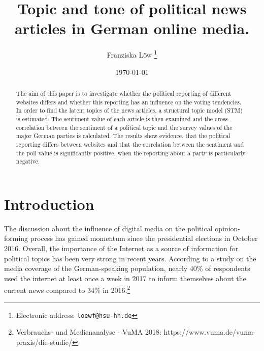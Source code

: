 \documentclass[12pt,a4paper,notitlepage]{article}
\title{Topic and tone of political news articles in German online media.}
\date{\today}
\author{Franziska Löw%
  \thanks{Electronic address: \texttt{loewf@hsu-hh.de}}}
\affil{Department of Industrial Economics,\\ Helmut Schmidt University,\\ Hamburg, Germany}
\begin{document}
\begin{titlepage}
	\maketitle
	\begin{abstract}
	The aim of this paper is to investigate whether the political reporting of different websites differs and whether this reporting has an influence on the voting tendencies. In order to find the latent topics of the news articles, a structural topic model (STM) is estimated. The sentiment value of each article is then examined and the cross-correlation between the sentiment of a political topic and the survey values of the major German parties is calculated. The results show evidence, that the political reporting differs between websites and that the correlation between the sentiment and the poll value is significantly positive, when the reporting about a party is particularly negative.

	\end{abstract}

\end{titlepage}

\tableofcontents

\pagebreak

\section{Introduction}

The discussion about the influence of digital media on the political opinion-forming process has gained momentum since the presidential elections in October 2016. Overall, the importance of the Internet as a source of information for political topics has been very strong in recent years. According to a study on the media coverage of the German-speaking population, nearly 40\% of respondents used the internet at least once a week in 2017 to inform themselves about the current news compared to 34\% in 2016.\footnote{Verbrauchs- und Medienanalyse - VuMA 2018: https://www.vuma.de/vuma-praxis/die-studie/}
\end{document}
